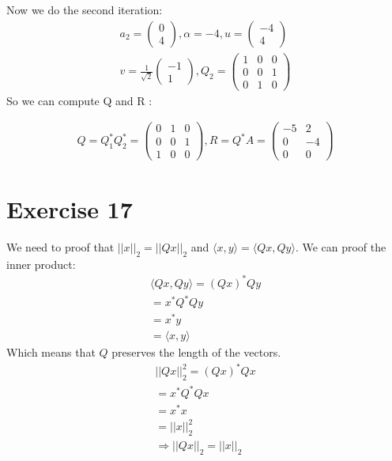 Now we do the second iteration:
\begin{gather*}
a_2 =\left( \begin{array}{c}
0 \\ 
4
\end{array} \right),
\alpha = -4 , 
u = \left( \begin{array}{c}
-4 \\ 
4
\end{array} \right)\\
v = \frac{1}{\sqrt{2}}\left( \begin{array}{c}
-1 \\ 
1
\end{array} \right), Q_2 = \left( \begin{array}{ccc}
1 & 0 & 0 \\ 
0 & 0 & 1\\
0 & 1 & 0
\end{array} \right)
\end{gather*}
So we can compute Q and R :

\begin{gather*}
Q = Q_1^*Q_2^* = \left( \begin{array}{ccc}
0 & 1 & 0 \\ 
0 & 0 &1 \\
1 & 0 & 0
\end{array} \right),
R = Q^*A = \left( \begin{array}{ccc}
-5 & 2 \\
0 & -4\\
0 & 0
\end{array} \right)
\end{gather*}

\section{Exercise 17}
We need to proof that $|| x||_2 = ||Qx||_2 $ and $ \langle x, y \rangle = \langle Qx, Qy \rangle$.
We can proof the inner product:
\begin{gather*}
\langle Qx,Qy \rangle = (Qx)^*Qy \\
= x^* Q^* Q y \\
= x^* y \\
= \langle x,y \rangle
\end{gather*}
Which means that $Q$ preserves the length of the vectors.
\begin{gather*}
||Qx||_2^2 = (Qx)^* Qx \\
= x^*Q^* Q x\\
= x^*x\\
= || x||_2^2 \\
\Rightarrow ||Qx||_2 = ||x||_2 
\end{gather*}
